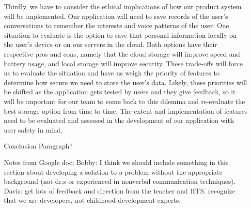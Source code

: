 Thirdly, we have to consider the ethical implications of how our product system will be implemented. Our application will need to save records of the user's conversations to remember the interests and voice patterns of the user. One situation to evaluate is the option to save that personal information locally on the user's device or on our servers in the cloud. Both options have their respective pros and cons, namely that the cloud storage will improve speed and battery usage, and local storage will improve security. These trade-offs will force us to evaluate the situation and have us weigh the priority of features to determine how secure we need to store the user's data. Likely, these priorities will be shifted as the application gets tested by users and they give feedback, so it will be important for our team to come back to this dilemma and re-evaluate the best storage option from time to time. The extent and implementation of features need to be evaluated and assessed in the development of our application with user safety in mind.


Conclusion Paragraph?

Notes from Google doc:
Bobby: I think we should include something in this section about developing a solution to a problem without the appropriate background (not dr.s or experienced in nonverbal communication techniques).
Davis: get lots of feedback and direction from the teacher and HTS. recognize that we are developers, not childhood development experts.

